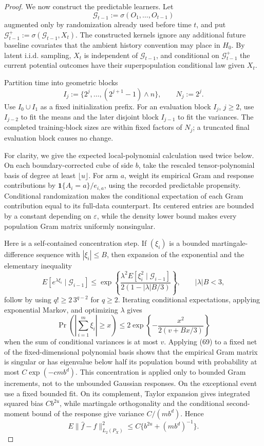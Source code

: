 \documentclass{article}
\begin{document}
\begin{proof}
We now construct the predictable learners. Let
\[
\mathcal G_{t-1}:=\sigma(O_1,\ldots,O_{t-1})
\]
augmented only by randomization already used before time \(t\), and put \(\mathcal G_{t-1}^{+}:=\sigma(\mathcal G_{t-1},X_t)\). The constructed kernels ignore any additional future baseline covariates that the ambient history convention may place in \(H_0\). By latent i.i.d. sampling, \(X_t\) is independent of \(\mathcal G_{t-1}\), and conditional on \(\mathcal G_{t-1}^{+}\) the current potential outcomes have their superpopulation conditional law given \(X_t\).

Partition time into geometric blocks
\[
I_j:=\{2^j,\ldots,(2^{j+1}-1)\wedge n\},
\qquad N_j:=2^j.
\tag{68}
\]
Use \(I_0\cup I_1\) as a fixed initialization prefix. For an evaluation block \(I_j\), \(j\geq2\), use \(I_{j-2}\) to fit the means and the later disjoint block \(I_{j-1}\) to fit the variances. The completed training-block sizes are within fixed factors of \(N_j\); a truncated final evaluation block causes no change.

For clarity, we give the expected local-polynomial calculation used twice below. On each boundary-corrected cube of side \(b\), take the rescaled tensor-polynomial basis of degree at least \(\lfloor u\rfloor\). For arm \(a\), weight its empirical Gram and response contributions by \(\mathbf1\{A_i=a\}/e_{i,a}\), using the recorded predictable propensity. Conditional randomization makes the conditional expectation of each Gram contribution equal to its full-data counterpart. Its centered entries are bounded by a constant depending on \(\varepsilon\), while the density lower bound makes every population Gram matrix uniformly nonsingular.

Here is a self-contained concentration step. If \((\xi_i)\) is a bounded martingale-difference sequence with \(|\xi_i|\leq B\), then expansion of the exponential and the elementary inequality
\[
E[e^{\lambda\xi_i}\mid\mathcal G_{i-1}]
\leq
\exp\!\left\{
\frac{\lambda^2E[\xi_i^2\mid\mathcal G_{i-1}]}
{2(1-|\lambda|B/3)}
\right\},
\qquad |\lambda|B<3,
\]
follow by using \(q!\geq2\,3^{q-2}\) for \(q\geq2\). Iterating conditional expectations, applying exponential Markov, and optimizing \(\lambda\) gives
\[
\Pr\!\left(\left|\sum_{i=1}^m\xi_i\right|\geq x\right)
\leq2\exp\!\left\{-\frac{x^2}{2(v+Bx/3)}\right\}
\tag{69}
\]
when the sum of conditional variances is at most \(v\). Applying (69) to a fixed net of the fixed-dimensional polynomial basis shows that the empirical Gram matrix is singular or has eigenvalue below half its population bound with probability at most \(C\exp(-cmb^d)\). This concentration is applied only to bounded Gram increments, not to the unbounded Gaussian responses. On the exceptional event use a fixed bounded fit. On its complement, Taylor expansion gives integrated squared bias \(Cb^{2u}\), while martingale orthogonality and the conditional second-moment bound of the response give variance \(C/(mb^d)\). Hence
\[
E\|\widehat f-f\|_{L_2(P_X)}^2
\leq C\{b^{2u}+(mb^d)^{-1}\}.
\tag{70}
\]


\end{proof}
\end{document}
